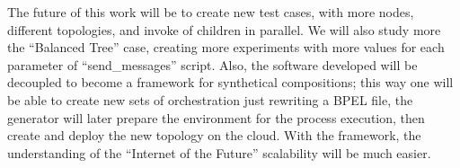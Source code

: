 The future of this work will be to create new test cases, with more nodes, different topologies, and invoke of children in parallel. We will also study more the ``Balanced Tree'' case, creating more experiments with more values for each parameter of ``send_messages'' script. Also, the software developed will be decoupled to become a framework for synthetical compositions; this way one will be able to create new sets of orchestration just rewriting a BPEL file, the generator will later prepare the environment for the process execution, then create and deploy the new topology on the cloud. With the framework, the understanding of the ``Internet of the Future'' scalability will be much easier.